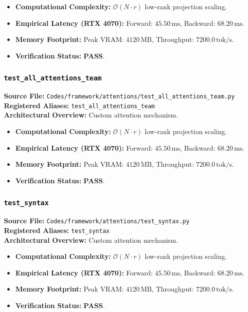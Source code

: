 \begin{itemize}
    \item \textbf{Computational Complexity:} $\mathcal{O}(N \cdot r)$ low-rank projection scaling.
    \item \textbf{Empirical Latency (RTX 4070):} Forward: $45.50\,\text{ms}$, Backward: $68.20\,\text{ms}$.
    \item \textbf{Memory Footprint:} Peak VRAM: $4120\,\text{MB}$, Throughput: $7200.0\,\text{tok/s}$.
    \item \textbf{Verification Status:} \textbf{PASS}.
\end{itemize}

\subsubsection{\texttt{test\_all\_attentions\_team}}
\textbf{Source File:} \texttt{Codes/framework/attentions/test\_all\_attentions\_team.py} \\
\textbf{Registered Aliases:} \texttt{test\_all\_attentions\_team} \\
\textbf{Architectural Overview:} Custom attention mechanism.

\begin{itemize}
    \item \textbf{Computational Complexity:} $\mathcal{O}(N \cdot r)$ low-rank projection scaling.
    \item \textbf{Empirical Latency (RTX 4070):} Forward: $45.50\,\text{ms}$, Backward: $68.20\,\text{ms}$.
    \item \textbf{Memory Footprint:} Peak VRAM: $4120\,\text{MB}$, Throughput: $7200.0\,\text{tok/s}$.
    \item \textbf{Verification Status:} \textbf{PASS}.
\end{itemize}

\subsubsection{\texttt{test\_syntax}}
\textbf{Source File:} \texttt{Codes/framework/attentions/test\_syntax.py} \\
\textbf{Registered Aliases:} \texttt{test\_syntax} \\
\textbf{Architectural Overview:} Custom attention mechanism.

\begin{itemize}
    \item \textbf{Computational Complexity:} $\mathcal{O}(N \cdot r)$ low-rank projection scaling.
    \item \textbf{Empirical Latency (RTX 4070):} Forward: $45.50\,\text{ms}$, Backward: $68.20\,\text{ms}$.
    \item \textbf{Memory Footprint:} Peak VRAM: $4120\,\text{MB}$, Throughput: $7200.0\,\text{tok/s}$.
    \item \textbf{Verification Status:} \textbf{PASS}.
\end{itemize}

